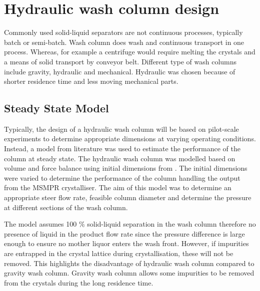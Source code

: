 \section{Hydraulic wash column design}

Commonly used solid-liquid separators are not continuous processes, typically batch or semi-batch. Wash column does wash and continuous transport in one process. Whereas, for example a centrifuge would require  melting the crystals and a means of solid transport by conveyor belt. Different type of wash columns include gravity, hydraulic and mechanical. Hydraulic was chosen because of shorter residence time and less moving mechanical parts. 

\subsection{Steady State Model}   

Typically, the design of a hydraulic wash column will be based on pilot-scale experiments to determine appropriate dimensions at varying operating conditions. Instead, a  model from literature \cite{van_oord-knol_hydraulic_2000} was used to estimate the performance of the column at steady state. The hydraulic wash column was modelled based on volume and force balance using initial dimensions from \cite{oordknol_dynamic_2002}. The initial dimensions were varied to determine the performance of the column handling the output from the MSMPR crystalliser. The aim of this model was to determine an appropriate steer flow rate, feasible column diameter and determine the pressure at different sections of the wash column. 

The model assumes 100 \% solid-liquid separation in the wash column therefore no presence of liquid in the product flow rate since the pressure difference is large enough to ensure no mother liquor enters the wash front. However, if impurities are entrapped in the crystal lattice during crystallisation, these will not be removed. This highlights the disadvantage of hydraulic wash column compared to gravity wash column. Gravity wash column allows some impurities to be removed from the crystals during the long residence time. 

